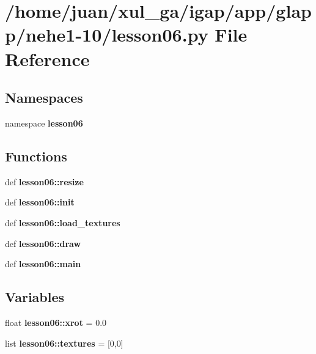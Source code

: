 \section{/home/juan/xul\_\-ga/igap/app/glapp/nehe1-10/lesson06.py File Reference}
\label{nehe1-10_2lesson06_8py}
\subsection*{Namespaces}
\begin{CompactItemize}
\item 
namespace {\bf lesson06}
\end{CompactItemize}
\subsection*{Functions}
\begin{CompactItemize}
\item 
def {\bf lesson06::resize}
\item 
def {\bf lesson06::init}
\item 
def {\bf lesson06::load\_\-textures}
\item 
def {\bf lesson06::draw}
\item 
def {\bf lesson06::main}
\end{CompactItemize}
\subsection*{Variables}
\begin{CompactItemize}
\item 
float {\bf lesson06::xrot} = 0.0
\item 
list {\bf lesson06::textures} = [0,0]
\end{CompactItemize}
